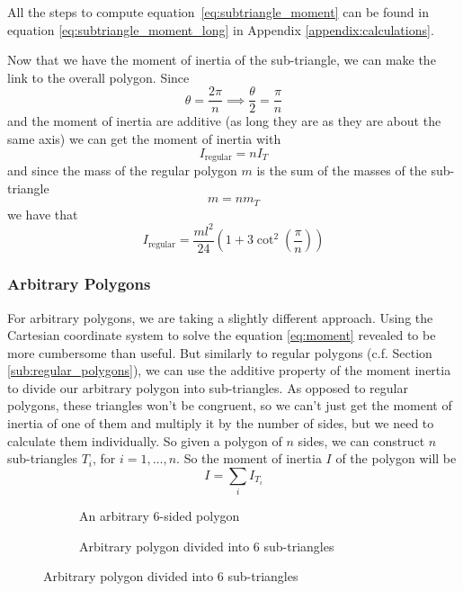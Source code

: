 All the steps to compute equation~\ref{eq:subtriangle_moment} can be found in
equation \ref{eq:subtriangle_moment_long} in Appendix
\ref{appendix:calculations}.

Now that we have the moment of inertia of the sub-triangle, we can make the link
to the overall polygon. Since
$$ \theta = \frac{2\pi}{n} \implies \frac{\theta}{2} = \frac{\pi}{n} $$
and the moment of inertia are additive (as long they are as they are about the
same axis) we can get the moment of inertia with
$$ I_{\text{regular}} = n I_T $$
and since the mass of the regular polygon $m$ is the sum of the masses of the
sub-triangle
$$ m = n m_T $$
we have that
\begin{equation}
	\label{eq:regular_moment}
	I_{\text{regular}} = \frac{ml^2}{24} \left( 1 + 3\cot^2\left(\frac{\pi}{n}\right) \right)
\end{equation}

\subsubsection{Arbitrary Polygons}

For arbitrary polygons, we are taking a slightly different approach. Using the
Cartesian coordinate system to solve the equation \ref{eq:moment} revealed to be
more cumbersome than useful. But similarly to regular polygons (c.f. Section
\ref{sub:regular_polygons}), we can use the additive property of the moment
inertia to divide our arbitrary polygon into sub-triangles. As opposed to
regular polygons, these triangles won't be congruent, so we can't just get the
moment of inertia of one of them and multiply it by the number of sides, but we
need to calculate them individually. So given a polygon of $n$ sides, we can
construct $n$ sub-triangles $T_i$, for $i = 1, \dots, n$. So the moment of
inertia $I$ of the polygon will be
\begin{equation}
	I = \sum_i I_{T_i}
\end{equation}
\begin{figure}[H]
	\centering
	\begin{subfigure}[]{.5\textwidth}
		\centering
		\caption{An arbitrary 6-sided polygon}
		\label{fig:arbitrary}
	\end{subfigure}
	\begin{subfigure}[]{.49\textwidth}
		\centering
		\caption{Arbitrary polygon divided into 6 sub-triangles}
		\label{fig:abitrary_divded}
	\end{subfigure}
\end{figure}

